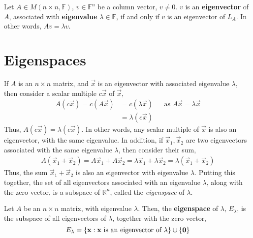 \documentclass[letterpaper,12pt]{article}
\begin{document}
\begin{definition}
Let $A \in M(n \times n, \mathbb{F})$, $v \in \mathbb{F}^n$ be a column vector, $v \neq 0$. $v$ is an \textbf{eigenvector} of $A$, associated with \textbf{eigenvalue} $\lambda \in \mathbb{F}$, if and only if $v$ is an eigenvector of $L_{A}$. In other words, $Av = \lambda v$.
\end{definition}

\section*{Eigenspaces}
If $A$ is an $n \times n$ matrix, and $\vec{x}$ is an eigenvector with associated eigenvalue $\lambda$, then consider a scalar multiple $c\vec{x}$ of $\vec{x}$,
\begin{align*}
    A(c\vec{x}) = c(A\vec{x}) & = c(\lambda \vec{x}) && \text{as $A\vec{x} = \lambda \vec{x}$} \\
    & = \lambda (c\vec{x})
\end{align*}
Thus, $A(c\vec{x}) = \lambda (c\vec{x})$. In other words, any scalar multiple of $\vec{x}$ is also an eigenvector, with the same eigenvalue. In addition, if $\vec{x}_1, \vec{x}_2$ are two eigenvectors associated with the same eigenvalue $\lambda$, then consider their sum,
\begin{align*}
    A(\vec{x}_1 + \vec{x}_2) = A\vec{x}_1 + A\vec{x}_2 = \lambda \vec{x}_1 + \lambda \vec{x}_2 = \lambda(\vec{x}_1 + \vec{x}_2)
\end{align*}
Thus, the sum $\vec{x}_1 + \vec{x}_2$ is also an eigenvector with eigenvalue $\lambda$. Putting this together, the set of all eigenvectors associated with an eigenvalue $\lambda$, along with the zero vector, is a subspace of $\mathbb{R}^n$, called the \textit{eigenspace} of $\lambda$.

\begin{definition}
Let $A$ be an $n \times n$ matrix, with eigenvalue $\lambda$. Then, the \textbf{eigenspace} of $\lambda$, $E_{\lambda}$, is the subspace of all eigenvectors of $\lambda$, together with the zero vector,
\begin{equation*}
    E_{\lambda} = \left\{ \mathbf{x}: \mathbf{x} \text{ is an eigenvector of $\lambda$} \right\} \cup \left\{ \mathbf{0} \right\}
\end{equation*}
\end{definition}
\end{document}
